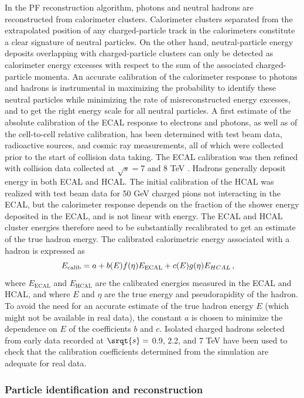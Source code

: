 In the PF reconstruction algorithm, photons and neutral hadrons are reconstructed from calorimeter clusters. Calorimeter clusters separated from the extrapolated position of any charged-particle track in the calorimeters constitute a clear signature of neutral particles.  On the other hand, neutral-particle energy deposits overlapping with charged-particle clusters can only be detected  as  calorimeter  energy  excesses  with  respect  to  the  sum  of  the  associated  charged-particle momenta. An accurate calibration of the calorimeter response to photons and hadrons is instrumental in maximizing the probability to identify these neutral particles while minimizing the rate of misreconstructed energy excesses, and to get the right energy scale for all neutral particles. A first estimate of the absolute calibration of the ECAL response to electrons and photons, as well as of the cell-to-cell relative calibration, has been determined with test beam data, radioactive sources,  and cosmic ray measurements,  all of which were collected prior to the start of collision data taking.  The ECAL calibration was then refined with collision data collected at $\sqrt{s}=$7 and 8 TeV \cite{2013}. Hadrons generally deposit energy in both ECAL and HCAL. The initial calibration of the HCAL was realized with test beam data for 50 GeV charged pions not interacting in the ECAL, but the calorimeter response depends on the fraction of the shower energy deposited in the ECAL, and is not linear with energy. The ECAL and HCAL cluster energies therefore need to be substantially recalibrated to get an estimate of the true hadron energy. The calibrated calorimetric energy associated with a hadron is expressed as
\begin{equation}
    E_{\mathrm{calib}} = a + b(E)f(\eta)E_{\mathrm{ECAL}} + c(E)g(\eta)E_{HCAL} \msep
\end{equation}
where $E_{\mathrm{ECAL}}$ and $E_{\mathrm{HCAL}}$ are the calibrated energies measured in the ECAL and HCAL, and where $E$ and $\eta$ are the true energy and pseudorapidity of the hadron. To avoid the need for an accurate estimate of the true hadron energy $E$ (which might not be available in real data),  the constant $a$ is chosen to minimize the dependence on $E$ of the coefficients $b$ and $c$. Isolated charged hadrons selected from early data recorded at $\srqt{s}=$ 0.9, 2.2, and 7 TeV have been used to check that the calibration coefficients determined from the simulation are adequate for real data.

\subsubsection{Particle identification and reconstruction}

